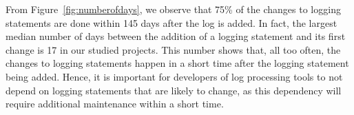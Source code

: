 %	
%		


From Figure~\ref{fig:numberofdays}, we observe that 75\% of the changes to logging statements are done within 145 days after the log is added. In fact, the largest median number of days between the addition of a logging statement and its first change is 17 in our studied projects. This number shows that, all too often, the changes to logging statements happen in a short time after the logging statement being added. Hence, it is important for developers of log processing tools to not depend on logging statements that are likely to change, as this dependency will require additional maintenance within a short time.







